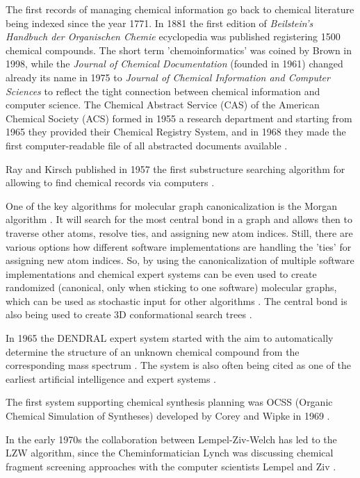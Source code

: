 \documentclass{sig-alternate}
\begin{document}
The first records of managing chemical information go back to chemical
literature being indexed since the year 1771.  In 1881 the first
edition of \textit{Beilstein's Handbuch der Organischen Chemie}
ecyclopedia was published \cite{polanski2009} registering 1500
chemical compounds. The short term 'chemoinformatics' was coined by
Brown in 1998\cite{brown1998}, while the \textit{Journal of Chemical
  Documentation} (founded in 1961) changed already its name in 1975 to
\textit{Journal of Chemical Information and Computer Sciences} to
reflect the tight connection between chemical information and computer
science. The Chemical Abstract Service (CAS) of the American Chemical
Society (ACS) formed in 1955 a research department and starting from
1965 they provided their Chemical Registry System, and in 1968 they
made the first computer-readable file of all abstracted documents
available \cite{Chen2006}.

Ray and Kirsch published in 1957 the first substructure searching
algorithm for allowing to find chemical records via computers
\cite{RayKirsch1957}.

One of the key algorithms for molecular graph canonicalization is the
Morgan algorithm \cite{Morgan1965}. It will search for the most
central bond in a graph and allows then to traverse other atoms,
resolve ties, and assigning new atom indices. Still, there are various
options how different software implementations are handling the 'ties'
for assigning new atom indices. So, by using the canonicalization of
multiple software implementations and chemical expert systems can be
even used to create randomized (canonical, only when sticking to one
software) molecular graphs, which can be used as stochastic input for
other algorithms \cite{cokfl06}. The central bond is also being used
to create 3D conformational search trees \cite{Schwab2001}.

In 1965 the DENDRAL expert system started with the aim to
automatically determine the structure of an unknown chemical compound
from the corresponding mass spectrum \cite{Gray1986}. The system is
also often being cited as one of the earliest artificial intelligence
and expert systems \cite{Chen2006}.

The first system supporting chemical synthesis planning was OCSS
(Organic Chemical Simulation of Syntheses) developed by Corey and
Wipke in 1969 \cite{CoreyWipke1969}.

In the early 1970s the collaboration between Lempel-Ziv-Welch has led
to the LZW algorithm, since the Cheminformatician Lynch was discussing
chemical fragment screening approaches with the computer scientists
Lempel and Ziv \cite{brown2009}.
\end{document}
